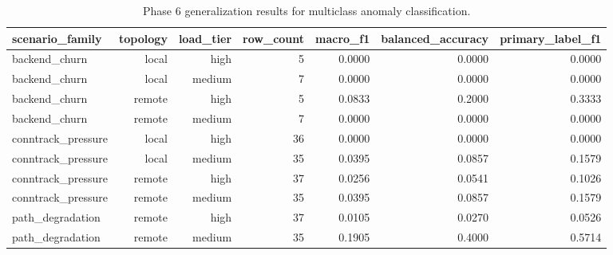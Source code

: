 \begin{table}[t]
\centering
\caption{Phase 6 generalization results for multiclass anomaly classification.}
\label{tab:phase6_generalization_multiclass}
\begin{tabular}{lrrrrrr}
\hline
scenario\_family & topology & load\_tier & row\_count & macro\_f1 & balanced\_accuracy & primary\_label\_f1 \\
\hline
backend\_churn & local & high & 5 & 0.0000 & 0.0000 & 0.0000 \\
backend\_churn & local & medium & 7 & 0.0000 & 0.0000 & 0.0000 \\
backend\_churn & remote & high & 5 & 0.0833 & 0.2000 & 0.3333 \\
backend\_churn & remote & medium & 7 & 0.0000 & 0.0000 & 0.0000 \\
conntrack\_pressure & local & high & 36 & 0.0000 & 0.0000 & 0.0000 \\
conntrack\_pressure & local & medium & 35 & 0.0395 & 0.0857 & 0.1579 \\
conntrack\_pressure & remote & high & 37 & 0.0256 & 0.0541 & 0.1026 \\
conntrack\_pressure & remote & medium & 35 & 0.0395 & 0.0857 & 0.1579 \\
path\_degradation & remote & high & 37 & 0.0105 & 0.0270 & 0.0526 \\
path\_degradation & remote & medium & 35 & 0.1905 & 0.4000 & 0.5714 \\
\hline
\end{tabular}
\end{table}
